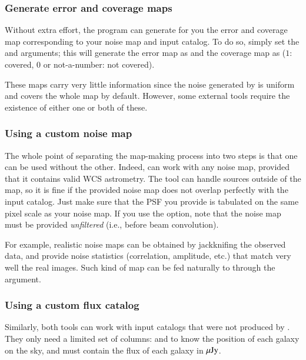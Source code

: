 \subsubsection{Generate error and coverage maps}

Without extra effort, the  program can generate for you the error and coverage map corresponding to your noise map and input catalog. To do so, simply set the  and  arguments; this will generate the error map as  and the coverage map as  ($1$: covered, $0$ or not-a-number: not covered).

These maps carry very little information since the noise generated by  is uniform and covers the whole map by default. However, some external tools require the existence of either one or both of these.


\subsubsection{Using a custom noise map}

The whole point of separating the map-making process into two steps is that one can be used without the other. Indeed,  can work with any noise map, provided that it contains valid WCS astrometry. The tool can handle sources outside of the map, so it is fine if the provided noise map does not overlap perfectly with the input catalog. Just make sure that the PSF you provide is tabulated on the same pixel scale as your noise map. If you use the  option, note that the noise map must be provided \emph{unfiltered} (i.e., before beam convolution).

For example, realistic \herschel noise maps can be obtained by jackknifing the observed data, and provide noise statistics (correlation, amplitude, etc.) that match very well the real images. Such kind of map can be fed naturally to  through the  argument.


\subsubsection{Using a custom flux catalog}

Similarly, both tools can work with input catalogs that were not produced by . They only need a limited set of columns:  and  to know the position of each galaxy on the sky, and  must contain the flux of each galaxy in $\mu{\rm Jy}$.

